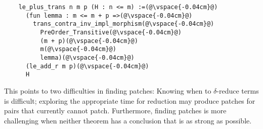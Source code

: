 \begin{lstlisting}
    le_plus_trans n m p (H : n <= m) :=(@\vspace{-0.04cm}@)
      (fun lemma : m <= m + p =>(@\vspace{-0.04cm}@)
        trans_contra_inv_impl_morphism(@\vspace{-0.04cm}@)
          PreOrder_Transitive(@\vspace{-0.04cm}@)
          (m + p)(@\vspace{-0.04cm}@)
          m(@\vspace{-0.04cm}@)
          lemma)(@\vspace{-0.04cm}@)
      (le_add_r m p)(@\vspace{-0.04cm}@)
      H
\end{lstlisting}

This points to two difficulties in finding patches: Knowing when to $\delta$-reduce terms 
is difficult; exploring the appropriate time for reduction
may produce patches for pairs that \sysname currently cannot patch.
Furthermore, finding patches is more challenging
when neither theorem has a conclusion that is as strong as possible.
